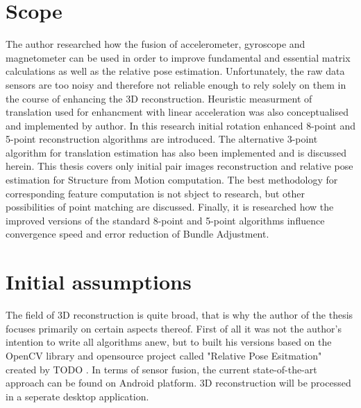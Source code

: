 \section{Scope}
The author researched how the fusion of accelerometer, gyroscope and magnetometer can be used in order to improve fundamental and essential matrix calculations as well as the relative pose estimation. Unfortunately, the raw data sensors are too noisy and therefore not reliable enough to rely solely on them in the course of enhancing the 3D reconstruction. Heuristic measurment of translation used for enhancment with linear acceleration was also conceptualised and implemented by author. In this research initial rotation enhanced 8-point and 5-point reconstruction algorithms are introduced. The alternative 3-point algorithm for translation estimation has also been implemented and is discussed herein.
This thesis covers only initial pair images reconstruction and relative pose estimation for Structure from Motion computation. The best methodology for corresponding feature computation is not sbject to research, but other possibilities of point matching are discussed. Finally, it is researched how the improved versions of the standard 8-point and 5-point algorithms influence convergence speed and error reduction of Bundle Adjustment.
\section{Initial assumptions}
The field of 3D reconstruction is quite broad, that is why the author of the thesis focuses primarily on certain aspects thereof. First of all it was not the author's intention to write all algorithms anew, but to built his versions based on the OpenCV library and opensource project called "Relative Pose Esitmation" created by TODO . In terms of sensor fusion, the current state-of-the-art approach can be found on Android platform. 3D reconstruction will be processed in a seperate desktop application.
